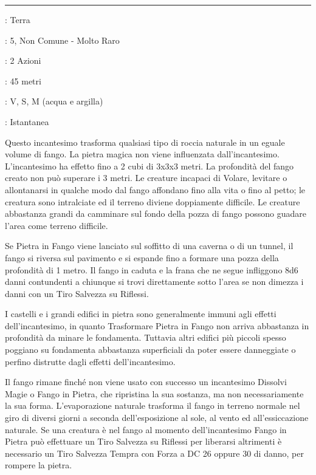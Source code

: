 \begin{multicols}{2}
\smallskip\noindent\rule{\linewidth}{2pt} \hypertarget{Pietra in Fango - Fango in Pietra}{}\medskip{}
\noindent
\begin{description}[noitemsep, topsep=0pt, parsep=0pt, partopsep=0pt, leftmargin=0cm, labelwidth=2.8cm]
	\item[\textbf{Lista di Magia}]: Terra
	\item[\textbf{Livello}]: 5, Non Comune - Molto Raro
	\item[\textbf{T. di Lancio}]: 2 Azioni
	\item[\textbf{Gittata}]: 45 metri
	\item[\textbf{Componenti}]: V, S, M (acqua e argilla)
	\item[\textbf{Durata}]: Istantanea
\end{description}

Questo incantesimo trasforma qualsiasi tipo di roccia naturale in un eguale volume di fango. La pietra magica non viene influenzata dall'incantesimo. L'incantesimo ha effetto fino a 2 cubi di 3x3x3 metri. La profondità del fango creato non può superare i 3 metri. Le creature incapaci di Volare, levitare o allontanarsi in qualche modo dal fango affondano fino alla vita o fino al petto; le creatura sono intralciate ed il terreno diviene doppiamente difficile. Le creature abbastanza grandi da camminare sul fondo della pozza di fango possono guadare l'area come terreno difficile.

Se Pietra in Fango viene lanciato sul soffitto di una caverna o di un tunnel, il fango si riversa sul pavimento e si espande fino a formare una pozza della profondità di 1 metro. Il fango in caduta e la frana che ne segue infliggono 8d6 danni contundenti a chiunque si trovi direttamente sotto l'area se non dimezza i danni con un Tiro Salvezza su Riflessi.

I castelli e i grandi edifici in pietra sono generalmente immuni agli effetti dell'incantesimo, in quanto Trasformare Pietra in Fango non arriva abbastanza in profondità da minare le fondamenta. Tuttavia altri edifici più piccoli spesso poggiano su fondamenta abbastanza superficiali da poter essere danneggiate o perfino distrutte dagli effetti dell'incantesimo.

Il fango rimane finché non viene usato con successo un incantesimo Dissolvi Magie o Fango in Pietra, che ripristina la sua sostanza, ma non necessariamente la sua forma. L'evaporazione naturale trasforma il fango in terreno normale nel giro di diversi giorni a seconda dell'esposizione al sole, al vento ed all'essiccazione naturale.
Se una creatura è nel fango al momento dell'incantesimo Fango in Pietra può effettuare un Tiro Salvezza su Riflessi per liberarsi altrimenti è necessario un Tiro Salvezza Tempra con Forza a DC 26 oppure 30 di danno, per rompere la pietra.


\end{multicols}
